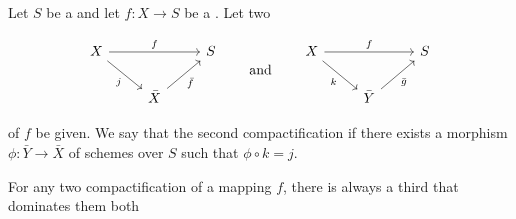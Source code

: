 \begin{definition} \label{definition:compactification_of_a_relative_scheme_that_dominates_another_compactification}
Let $S$ be a  and let $f: X \to S$ be a . Let two 

$$
\begin{tikzcd}
X \ar[rr, "f"] \ar[dr, "j"'] & & S \\
& \bar{X} \ar[ur, "\bar{f}"'] &
\end{tikzcd}
\qquad\text{and}\qquad
\begin{tikzcd}
X \ar[rr, "f"] \ar[dr, "k"'] & & S \\
& \bar{Y} \ar[ur, "\bar{g}"'] &
\end{tikzcd}
$$

of $f$ be given. We say that the second compactification  if there exists a morphism $\phi: \bar{Y} \to \bar{X}$ of schemes over $S$ such that $\phi \circ k = j$.

For any two compactification of a mapping $f$, there is always a third that dominates them both 
\end{definition}
